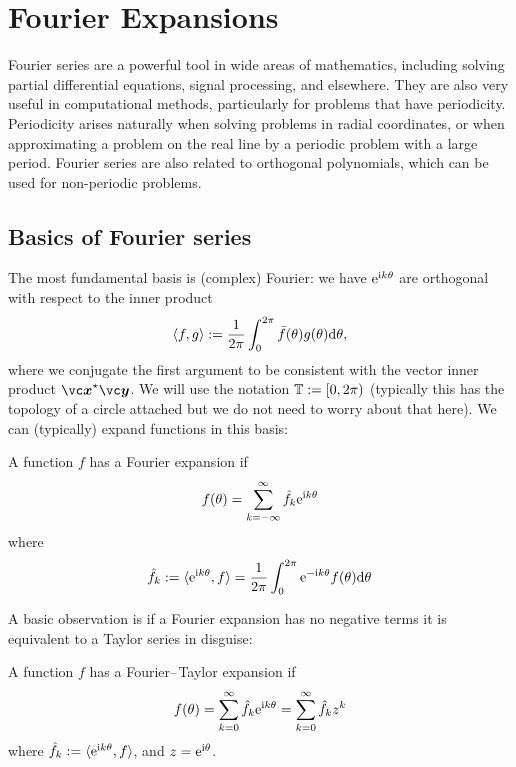 
\section{Fourier Expansions}
Fourier series are a powerful tool in wide areas of mathematics, including solving partial differential equations, signal processing, and elsewhere. They are also very useful in computational methods, particularly for problems that have periodicity. Periodicity arises naturally when solving problems in radial coordinates, or when approximating a problem on the real line by a periodic problem with a large period. Fourier series are also related to orthogonal polynomials, which can be used for non-periodic problems.

\subsection{Basics of Fourier series}
The most fundamental basis is (complex) Fourier: we have ${\rm e}^{{\rm i} k \ensuremath{\theta}}$ are orthogonal with respect to the inner product
\[
\ensuremath{\langle}f, g \ensuremath{\rangle} := {1 \over 2\ensuremath{\pi}} \ensuremath{\int}_0^{2\ensuremath{\pi}} \bar f(\ensuremath{\theta}) g(\ensuremath{\theta}) {\rm d}\ensuremath{\theta},
\]
where we conjugate the first argument to be consistent with the vector inner product $\ensuremath{\bm{\x}}^\ensuremath{\star} \ensuremath{\bm{\y}}$. We will use the notation ${\mathbb T} := [0,2\pi)$ (typically this has the topology of a circle attached but we do not need to worry about that here). We can (typically) expand functions in this basis:

\begin{definition}[Fourier] A function $f$ has a Fourier expansion if
\[
f(\ensuremath{\theta}) = \ensuremath{\sum}_{k = -\ensuremath{\infty}}^\ensuremath{\infty} \hat f_k {\rm e}^{{\rm i} k \ensuremath{\theta}}
\]
where
\[
\hat f_k := \ensuremath{\langle}{\rm e}^{{\rm i} k \ensuremath{\theta}}, f\ensuremath{\rangle} = {1 \over 2\ensuremath{\pi}} \ensuremath{\int}_0^{2\ensuremath{\pi}}  {\rm e}^{-{\rm i} k \ensuremath{\theta}} f(\ensuremath{\theta}) {\rm d}\ensuremath{\theta}
\]
\end{definition}

A basic observation is if a Fourier expansion has no negative terms it is equivalent to a Taylor series in disguise:

\begin{definition} A function $f$ has a Fourier\ensuremath{\endash}Taylor expansion if
\[
f(\ensuremath{\theta}) = \ensuremath{\sum}_{k = 0}^\ensuremath{\infty} \hat f_k {\rm e}^{{\rm i} k \ensuremath{\theta}} = \ensuremath{\sum}_{k = 0}^\ensuremath{\infty} \hat f_k z^k
\]
where $\hat f_k := \ensuremath{\langle}{\rm e}^{{\rm i} k \ensuremath{\theta}}, f\ensuremath{\rangle}$, and $z = {\rm e}^{{\rm i} \ensuremath{\theta}}$. \end{definition}

